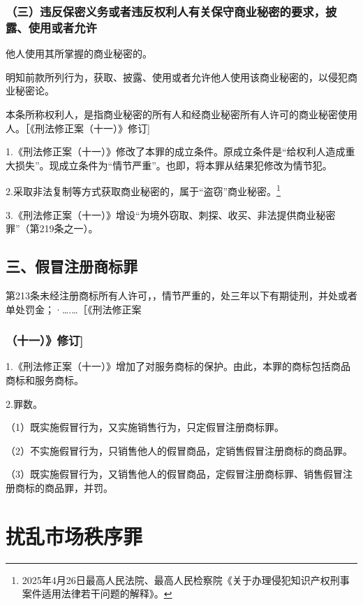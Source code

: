 \subsubsection*{（三）违反保密义务或者违反权利人有关保守商业秘密的要求，披露、使用或者允许}

他人使用其所掌握的商业秘密的。

明知前款所列行为，获取、披露、使用或者允许他人使用该商业秘密的，以侵犯商业秘密论。

本条所称权利人，是指商业秘密的所有人和经商业秘密所有人许可的商业秘密使用人。［《刑法修正案（十一）》修订]

1.《刑法修正案（十一）》修改了本罪的成立条件。原成立条件是“给权利人造成重大损失”。现成立条件为“情节严重”。也即，将本罪从结果犯修改为情节犯。

2.采取非法复制等方式获取商业秘密的，属于“盗窃”商业秘密。\footnote{2025年4月26日最高人民法院、最高人民检察院《关于办理侵犯知识产权刑事案件适用法律若干问题的解释》。}

3.《刑法修正案（十一）》增设“为境外窃取、刺探、收买、非法提供商业秘密罪”（第219条之一）。

\subsection*{三、假冒注册商标罪}

第213条未经注册商标所有人许可，，情节严重的，处三年以下有期徒刑，并处或者单处罚金；·….…［《刑法修正案

\subsubsection*{（十一）》修订]}

1.《刑法修正案（十一）》增加了对服务商标的保护。由此，本罪的商标包括商品商标和服务商标。

2.罪数。

（1）既实施假冒行为，又实施销售行为，只定假冒注册商标罪。

（2）不实施假冒行为，只销售他人的假冒商品，定销售假冒注册商标的商品罪。

（3）既实施假冒行为，又销售他人的假冒商品，定假冒注册商标罪、销售假冒注册商标的商品罪，并罚。

\section{扰乱市场秩序罪}

